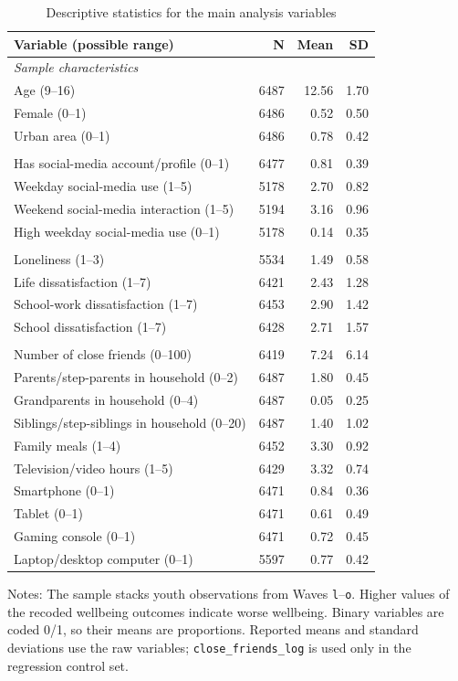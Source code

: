 \begin{table}[!htbp]
\centering
\caption{Descriptive statistics for the main analysis variables}
\label{tab:descriptive_statistics}
\small
\renewcommand{\arraystretch}{1.12}
\begin{tabular}{p{}rrr}
\toprule
Variable (possible range) & N & Mean & SD \\
\midrule
\multicolumn{4}{l}{\textit{Sample characteristics}} \\
Age (9--16) & 6487 & 12.56 & 1.70 \\
Female (0--1) & 6486 & 0.52 & 0.50 \\
Urban area (0--1) & 6486 & 0.78 & 0.42 \\
\addlinespace
\multicolumn{4}{l}{\textit{Social-media exposure}} \\
Has social-media account/profile (0--1) & 6477 & 0.81 & 0.39 \\
Weekday social-media use (1--5) & 5178 & 2.70 & 0.82 \\
Weekend social-media interaction (1--5) & 5194 & 3.16 & 0.96 \\
High weekday social-media use (0--1) & 5178 & 0.14 & 0.35 \\
\addlinespace
\multicolumn{4}{l}{\textit{Mental wellbeing}} \\
Loneliness (1--3) & 5534 & 1.49 & 0.58 \\
Life dissatisfaction (1--7) & 6421 & 2.43 & 1.28 \\
School-work dissatisfaction (1--7) & 6453 & 2.90 & 1.42 \\
School dissatisfaction (1--7) & 6428 & 2.71 & 1.57 \\
\addlinespace
\multicolumn{4}{l}{\textit{Baseline controls}} \\
Number of close friends (0--100) & 6419 & 7.24 & 6.14 \\
Parents/step-parents in household (0--2) & 6487 & 1.80 & 0.45 \\
Grandparents in household (0--4) & 6487 & 0.05 & 0.25 \\
Siblings/step-siblings in household (0--20) & 6487 & 1.40 & 1.02 \\
Family meals (1--4) & 6452 & 3.30 & 0.92 \\
Television/video hours (1--5) & 6429 & 3.32 & 0.74 \\
Smartphone (0--1) & 6471 & 0.84 & 0.36 \\
Tablet (0--1) & 6471 & 0.61 & 0.49 \\
Gaming console (0--1) & 6471 & 0.72 & 0.45 \\
Laptop/desktop computer (0--1) & 5597 & 0.77 & 0.42 \\
\bottomrule
\end{tabular}
\begin{minipage}{0.9\textwidth}
\footnotesize Notes: The sample stacks youth observations from Waves \texttt{l}--\texttt{o}. Higher values of the recoded wellbeing outcomes indicate worse wellbeing. Binary variables are coded 0/1, so their means are proportions. Reported means and standard deviations use the raw variables; \texttt{close\_friends\_log} is used only in the regression control set.
\end{minipage}
\end{table}
